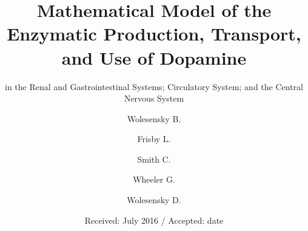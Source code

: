 \documentclass[smallextended]{svjour3}
\begin{document}
\title{Mathematical Model of the Enzymatic Production, Transport, and Use of Dopamine }
\subtitle{in the Renal and Gastrointestinal Systems; Circulatory System; and the Central Nervous System}
\author{Wolesensky B. \and
        Frisby L. \and
        Smith C. \and
        Wheeler G.\and
        Wolesensky  D.
}                                
\date{Received: July 2016 / Accepted: date}
\maketitle
\end{document}
